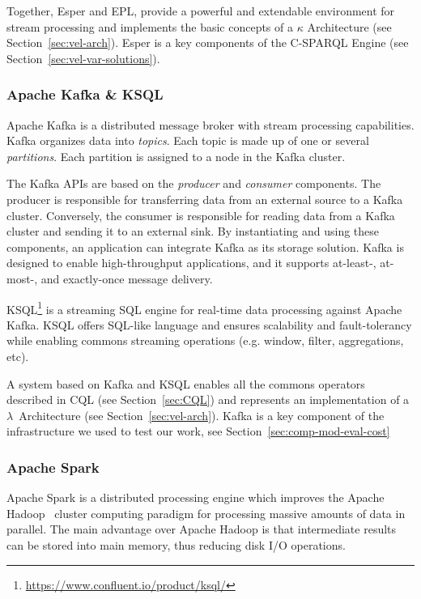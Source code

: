 Together, Esper and EPL, provide a powerful and extendable environment for stream processing and implements the basic concepts of a $\kappa$ Architecture (see Section~\ref{sec:vel-arch}).
Esper is a key components of the C-SPARQL Engine (see Section~\ref{sec:vel-var-solutions}).

\subsubsection{Apache Kafka \& KSQL} \label{sec:kafka}
Apache Kafka \cite{kreps2011kafka} is a distributed message broker with stream processing capabilities. Kafka organizes data into \textit{topics}. Each topic is made up of one or several \textit{partitions}. Each partition is assigned to a node in the Kafka cluster. 

The Kafka APIs are based on the \textit{producer} and \textit{consumer} components. The producer is responsible for transferring data from an external source to a Kafka cluster. Conversely, the consumer is responsible for reading data from a Kafka cluster and sending it to an external sink. By instantiating and using these components, an application can integrate Kafka as its storage solution. Kafka is designed to enable high-throughput applications, and it supports at-least-, at-most-, and exactly-once message delivery.

KSQL\footnote{\url{https://www.confluent.io/product/ksql/}} is a streaming SQL engine for real-time data processing against Apache Kafka. KSQL offers SQL-like language and ensures scalability and fault-tolerancy while enabling commons streaming operations (e.g. window, filter, aggregations, etc).

A system based on Kafka and KSQL enables all the commons operators described in CQL (see Section~\ref{sec:CQL}) and represents an implementation of a $\lambda$~Architecture (see Section~\ref{sec:vel-arch}).
Kafka is a key component of the infrastructure we used to test our work, see Section~\ref{sec:comp-mod-eval-cost}

\subsubsection{Apache Spark} \label{sec:spark}
Apache Spark \cite{zaharia2016apache} is a distributed processing engine which improves the Apache Hadoop~\cite{dean2008mapreduce} cluster computing paradigm for processing massive amounts of data in parallel. The main advantage over Apache Hadoop is that intermediate results can be stored into main memory, thus reducing disk I/O operations.


